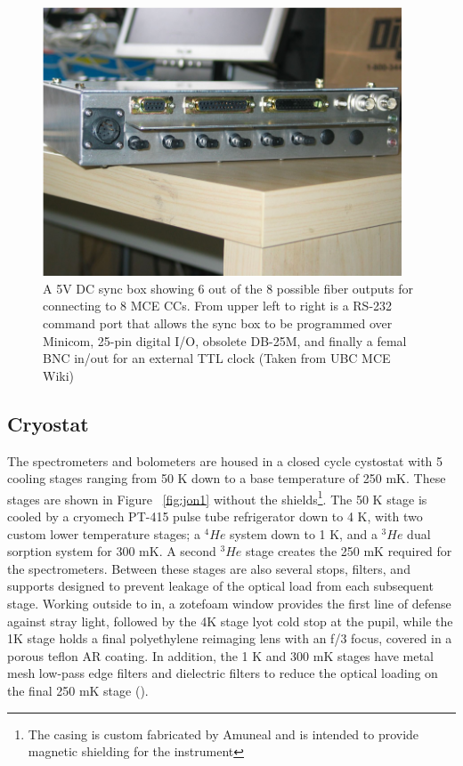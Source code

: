 \documentclass[manuscript]{aastex}
\begin{document}
\begin{figure}[H]
\centering
\captionsetup{width=0.95\textwidth}
\includegraphics[width=0.95\textwidth]{sync.png}
\caption[University of British Columbia Sync Box]{A 5V DC sync box showing 6 out of the 8 possible fiber outputs for connecting to 8 MCE CCs. From upper left to right is a RS-232 command port that allows the sync box to be programmed over {\sc Minicom}, 25-pin digital I/O, obsolete DB-25M, and finally a femal BNC in/out for an external TTL clock (Taken from UBC MCE Wiki)}
\label{fig:mce}
\vspace{-0.8cm}
\end{figure}

\subsection{Cryostat}
The spectrometers and bolometers are housed in a closed cycle cystostat with 5 cooling stages ranging from 50 K down to a base temperature of 250 mK. These stages are shown in Figure ~\ref{fig:jon1} without the shields\footnote{The casing is custom fabricated by {\sc Amuneal} and is intended to provide magnetic shielding for the instrument}. The 50 K stage is cooled by a cryomech PT-415 pulse tube refrigerator down to 4 K, with two custom lower temperature stages; a \(^{4}He\) system down to 1 K, and a \(^{3}He\) dual sorption system for 300 mK. A second \(^{3}He\) stage creates the 250 mK required for the spectrometers. Between these stages are also several stops, filters, and supports designed to prevent leakage of the optical load from each subsequent stage. Working outside to in, a zotefoam window provides the first line of defense against stray light, followed by the 4K stage lyot cold stop at the pupil, while the 1K stage holds a final polyethylene reimaging lens with an f/3 focus, covered in a porous teflon AR coating. In addition, the 1 K and 300 mK stages have metal mesh low-pass edge filters and dielectric filters to reduce the optical loading on the final 250 mK stage (\cite{Crites2014}).
\end{document}
